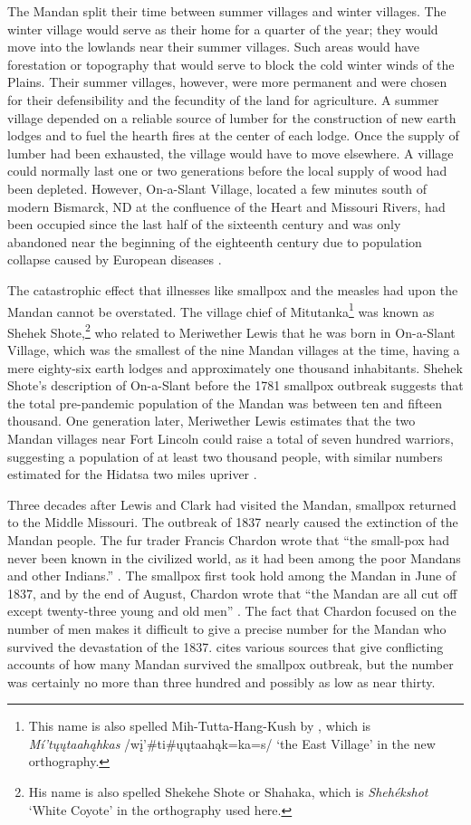 The Mandan split their time between summer villages and winter villages. The winter village would serve as their home for a quarter of the year; they would move into the lowlands near their summer villages. Such areas would have forestation or topography that would serve to block the cold winter winds of the Plains. Their summer villages, however, were more permanent and were chosen for their defensibility and the fecundity of the land for agriculture. A summer village depended on a reliable source of lumber for the construction of new earth lodges and to fuel the hearth fires at the center of each lodge. Once the supply of lumber had been exhausted, the village would have to move elsewhere. A village could normally last one or two generations before the local supply of wood had been depleted. However, On-a-Slant Village, located a few minutes south of modern Bismarck, ND at the confluence of the Heart and Missouri Rivers, had been occupied since the last half of the sixteenth century and was only abandoned near the beginning of the eighteenth century due to population collapse caused by European diseases \citep[118]{fenn2015}.

The catastrophic effect that illnesses like smallpox and the measles had upon the Mandan cannot be overstated. The village chief of Mitutanka\footnote{This name is also spelled Mih-Tutta-Hang-Kush by \citet{maximilian1839}, which is \textit{Mí'tųųtaahąhkas} /wį'\#ti\#ųųtaahąk=ka=s/ `the East Village' in the new orthography.} was known as Shehek Shote,\footnote{His name is also spelled Shekehe Shote or Shahaka, which is \textit{Shehékshot} `White Coyote' in the orthography used here.} who related to Meriwether Lewis that he was born in On-a-Slant Village, which was the smallest of the nine Mandan villages at the time, having a mere eighty-six earth lodges and approximately one thousand inhabitants. Shehek Shote's description of On-a-Slant before the 1781 smallpox outbreak suggests that the total pre-pandemic population of the Mandan was between ten and fifteen thousand. One generation later, Meriwether Lewis estimates that the two Mandan villages near Fort Lincoln could raise a total of seven hundred warriors, suggesting a population of at least two thousand people, with similar numbers estimated for the Hidatsa two miles upriver \citet[131]{allen1814a}. 

Three decades after Lewis and Clark had visited the Mandan, smallpox returned to the Middle Missouri. The outbreak of 1837 nearly caused the extinction of the Mandan people. The fur trader Francis Chardon wrote that ``the small-pox had never been known in the civilized world, as it had been among the poor Mandans and other Indians.'' \citep[20]{stearn1945}. The smallpox first took hold among the Mandan in June of 1837, and by the end of August, Chardon wrote that ``the Mandan are all cut off except twenty-three young and old men'' \citep[297]{calloway2008}. The fact that Chardon focused on the number of men makes it difficult to give a precise number for the Mandan who survived the devastation of the  1837. \citet[223]{fenn2015} cites various sources that give conflicting accounts of how many Mandan survived the smallpox outbreak, but the number was certainly no more than three hundred and possibly as low as near thirty.

